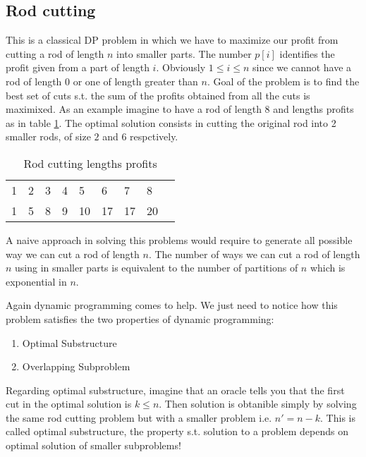 \subsection{Rod cutting}
This is a classical DP problem in which we have to maximize our profit from cutting a rod of length $n$ into smaller parts.
The number $p[i]$ identifies the profit given from a part of length $i$. Obviously $1 \leq i \leq n$ since we cannot have a rod of length $0$ or one of length greater than $n$.
Goal of the problem is to find the best set of cuts s.t. the sum of the profits obtained from all the cuts is maximixed.
As an example imagine to have a rod of length $8$ and lengths profits as in table \ref{rodcut}. The optimal solution consists in cutting the original rod into 2 smaller rods, of size $2$ and $6$ respctively. 
\begin{table}[]
\centering
\caption{Rod cutting lengths profits}
\label{rodcut}
\begin{tabular}{lllllllll}
 1&  2&  3&  4&  5&   6&   7&  8&\\
 1&  5&  8&  9&  10&  17&  17& 20& 
\end{tabular}
\end{table}
A naive approach in solving this problems would require to generate all possible way we can cut a rod of length $n$. The number of ways we can cut a rod of length $n$ using in smaller parts is equivalent to the number of partitions of $n$ which is exponential in $n$.

Again dynamic programming comes to help. We just need to notice how this problem satisfies the two properties of dynamic programming:
\begin{enumerate}
\item Optimal Substructure
\item Overlapping Subproblem
\end{enumerate}
Regarding optimal substructure, imagine that an oracle tells you that the first cut in the optimal solution is $k\leq n$. Then solution is obtanible simply by solving the same rod cutting problem but with a smaller problem i.e. $n' = n-k$. 
This is called optimal substructure, the property s.t. solution to a problem depends on optimal solution of smaller subproblems!


